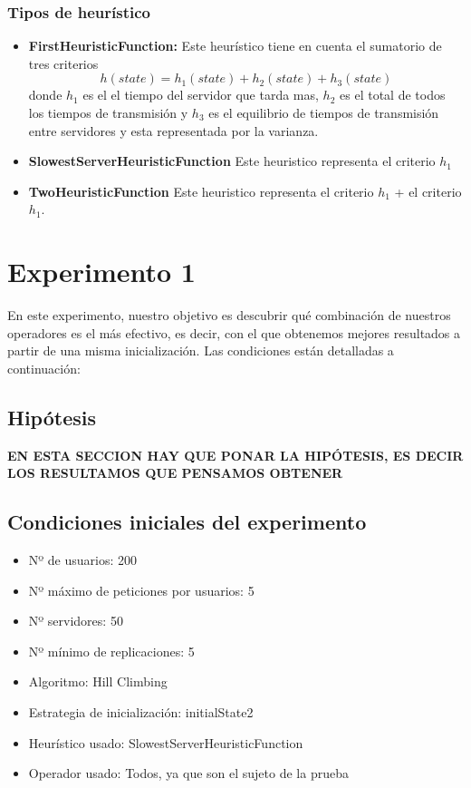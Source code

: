 \documentclass[a4paper,10pt]{report}
\begin{document}
        \subsection*{Tipos de heurístico}
            \begin{itemize}
                \item \textbf{FirstHeuristicFunction:} Este heurístico tiene en cuenta el sumatorio de tres criterios 
                    \begin{equation}
                        h(state) = h_1(state) + h_2(state) + h_3(state) 
                    \end{equation}
                    donde $h_1$ es el el tiempo del servidor que tarda mas, $h_2$ es el total de todos los tiempos de transmisión 
                    y $h_3$ es el equilibrio de tiempos de transmisión entre servidores y esta representada por la varianza. 
                \item \textbf{SlowestServerHeuristicFunction} Este heuristico representa el criterio $h_1$
                \item \textbf{TwoHeuristicFunction} Este heuristico representa 
                el criterio $h_1$ + el criterio $h_1$.
            \end{itemize}
            
	\chapter*{Experimento 1}

		En este experimento, nuestro objetivo es descubrir qué combinación de nuestros operadores es el más efectivo, es decir, con el que obtenemos mejores resultados a partir de una misma inicialización. Las condiciones están detalladas a continuación:\newline
		
		\section*{Hipótesis}
		\textbf{EN ESTA SECCION HAY QUE PONAR LA HIPÓTESIS, ES DECIR LOS RESULTAMOS QUE PENSAMOS OBTENER}

		\section*{Condiciones iniciales del experimento}
		\begin{itemize}
		    \item Nº de usuarios: 200
    		\item Nº máximo de peticiones por usuarios: 5
    		\item Nº servidores: 50
    		\item Nº mínimo de replicaciones: 5
    		\item Algoritmo: Hill Climbing
    		\item Estrategia de inicialización: initialState2
    		\item Heurístico usado: SlowestServerHeuristicFunction
    		\item Operador usado: Todos, ya que son el sujeto de la prueba 
		\end{itemize}
		
\end{document}
